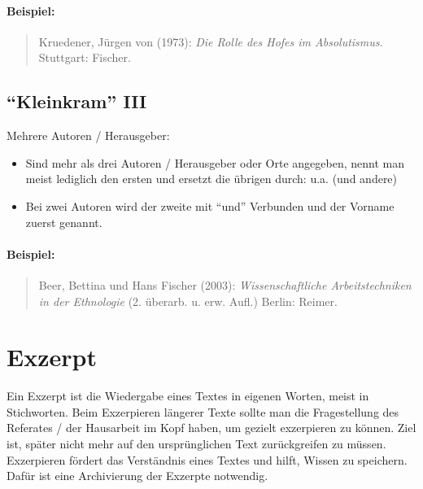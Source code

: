 \documentclass[ 12pt,
                titlepage,
                parskip=half,
                version=first,
                bibliography=totocnumbered,
                final,
                listof=totoc]{scrartcl}
\begin{document}
\paragraph{Beispiel:}
\begin{quote}
Kruedener, Jürgen von (1973): \emph{Die Rolle des Hofes im Absolutismus.}
Stuttgart: Fischer.
\end{quote}

\subsection{\enquote{Kleinkram} III}
\label{sec:sub_kleinkram_3}

\begin{description}
    \item[Mehrere Autoren / Herausgeber:]
\end{description}
\begin{itemize}
    \item Sind mehr als drei Autoren / Herausgeber oder Orte angegeben, nennt
    man meist lediglich den ersten und ersetzt die übrigen durch: u.a. (und
    andere)
    \item Bei zwei Autoren wird der zweite mit \enquote{und} Verbunden und der
    Vorname zuerst genannt.
\end{itemize}

\paragraph{Beispiel:}
\begin{quote}
Beer, Bettina und Hans Fischer (2003): \emph{Wissenschaftliche Arbeitstechniken
in der Ethnologie} (2. überarb. u. erw. Aufl.) Berlin: Reimer.
\end{quote}

\section{Exzerpt}
\label{sec:exzerpt}

Ein Exzerpt ist die Wiedergabe eines Textes in eigenen Worten, meist in
Stichworten. Beim Exzerpieren längerer Texte sollte man die Fragestellung des
Referates / der Hausarbeit im Kopf haben, um gezielt exzerpieren zu können. Ziel
ist, später nicht mehr auf den ursprünglichen Text zurückgreifen zu müssen.
Exzerpieren fördert das Verständnis eines Textes und hilft, Wissen zu speichern.
Dafür ist eine Archivierung der Exzerpte notwendig.
\end{document}
